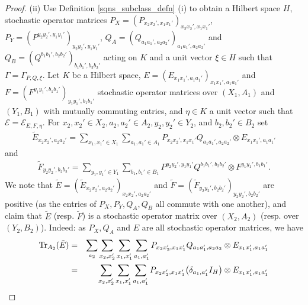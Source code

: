 \documentclass[11pt]{amsart}
\newcommand{\cl}[1]{\mathcal{#1}}
\begin{document}
\begin{proof}
(ii) Use Definition \ref{sqns_subclass_defn} (i) to obtain a Hilbert space $H$, stochastic operator matrices $P_{X} = (P_{x_{2}x_{2}', x_{1}x_{1}'})_{x_{2}x_{2}', x_{1}x_{1}'}$, $P_{Y} = (P^{y_{2}y_{2}', y_{1}y_{1}'})_{y_{2}y_{2}', y_{1}y_{1}'}$, $Q_{A} = (Q_{a_{1}a_{1}', a_{2}a_{2}'})_{a_{1}a_{1}', a_{2}a_{2}'}$ and $Q_{B} = (Q^{b_{1}b_{1}', b_{2}b_{2}'})_{b_{1}b_{1}', b_{2}b_{2}'}$ acting on $K$ and a unit vector $\xi \in H$ such that $\Gamma = \Gamma_{P, Q, \xi}$. Let $K$ be a Hilbert space, $E = (E_{x_{1}x_{1}', a_{1}a_{1}'})_{x_{1}x_{1}', a_{1}a_{1}'}$ and $F = (F^{y_{1}y_{1}', b_{1}b_{1}'})_{y_{1}y_{1}', b_{1}b_{1}'}$ stochastic operator matrices over $(X_{1}, A_{1})$ and $(Y_{1}, B_{1})$ with mutually commuting entries, and $\eta \in K$ a unit vector such that $\cl{E} = \cl{E}_{E, F, \eta}$. For $x_{2}, x_{2}' \in X_{2}, a_{2}, a_{2}' \in A_{2}, y_{2}, y_{2}' \in Y_{2}$, and $b_{2}, b_{2}' \in B_{2}$ set
\begin{gather}\label{qc_simulate_one}
	\tilde{E}_{x_{2}x_{2}', a_{2}a_{2}'} = \sum\limits_{x_{1}, x_{1}' \in X_{1}}\sum\limits_{a_{1}, a_{1}' \in A_{1}}P_{x_{2}x_{2}', x_{1}x_{1}'}Q_{a_{1}a_{1}', a_{2}a_{2}'}\otimes E_{x_{1}x_{1}', a_{1}a_{1}'}
\end{gather}
\noindent and
\begin{gather}\label{qc_simulate_two}
	\tilde{F}_{y_{2}y_{2}', b_{2}b_{2}'} = \sum\limits_{y_{1}, y_{1}' \in Y_{1}}\sum\limits_{b_{1}, b_{1}' \in B_{1}}P^{y_{2}y_{2}', y_{1}y_{1}'}Q^{b_{1}b_{1}', b_{2}b_{2}'}\otimes F^{y_{1}y_{1}', b_{1}b_{1}'}.
\end{gather}
\noindent We note that $\tilde{E} = (\tilde{E}_{x_{2}x_{2}', a_{2}a_{2}'})_{x_{2}x_{2}', a_{2}a_{2}'}$ and $\tilde{F} = (\tilde{F}_{y_{2}y_{2}', b_{2}b_{2}'})_{y_{2}y_{2}', b_{2}b_{2}'}$ are positive (as the entries of $P_{X}, P_{Y}, Q_{A}, Q_{B}$ all commute with one another), and claim that $\tilde{E}$ (resp. $\tilde{F}$) is a stochastic operator matrix over $(X_{2}, A_{2})$ (resp. over $(Y_{2}, B_{2})$). Indeed: as $P_{X}, Q_{A}$ and $E$ are all stochastic operator matrices, we have
\begin{eqnarray*}
	{\rm Tr}_{A_{2}}(\tilde{E})
& = &
\sum\limits_{a_{2}}\sum\limits_{x_{2}, x_{2}'}\sum\limits_{x_{1}, x_{1}'}\sum\limits_{a_{1}, a_{1}'}P_{x_{2}x_{2}', x_{1}x_{1}'}Q_{a_{1}a_{1}', a_{2}a_{2}}\otimes E_{x_{1}x_{1}', a_{1}a_{1}'} \\
& = &
\sum\limits_{x_{2}, x_{2}'}\sum\limits_{x_{1}, x_{1}'}\sum\limits_{a_{1}, a_{1}'}P_{x_{2}x_{2}', x_{1}x_{1}'}\big(\delta_{a_{1}, a_{1}'}I_{H}\big)\otimes E_{x_{1}x_{1}', a_{1}a_{1}'} \\

\end{eqnarray*}
\end{proof}
\end{document}
